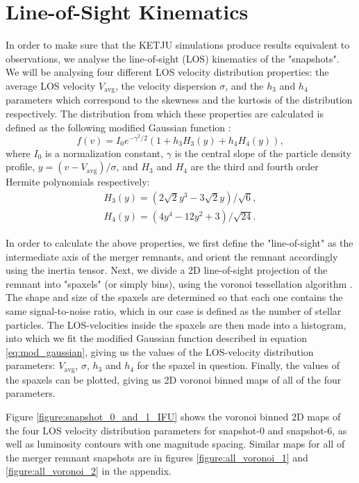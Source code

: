 \documentclass[english, oneside]{HYgradu}
\begin{document}
\section{Line-of-Sight Kinematics}

In order to make sure that the KETJU simulations produce results equivalent to observations, we analyse the line-of-sight (LOS) kinematics of the "snapshots". We will be analysing four different LOS velocity distribution properties: the average LOS velocity $V_\mathrm{avg}$, the velocity dispersion $\sigma$, and the $h_3$ and $h_4$ parameters which correspond to the skewness and the kurtosis of the distribution respectively. The distribution from which these properties are calculated is defined as the following modified Gaussian function \citep{Rantala2018}:
\begin{equation}
f(v) = I_0 e^{-\gamma^2/2}(1 + h_3 H_3(y) + h_4 H_4(y)), \label{eq:mod_gaussian}
\end{equation} 
where $I_0$ is a normalization constant, $\gamma$ is the central slope of the particle density profile, $y = (v - V_\mathrm{avg})/\sigma$, and $H_3$ and $H_4$ are the third and fourth order Hermite polynomials respectively:
\begin{eqnarray}
H_3(y) = \left(2\sqrt{2}y^3 - 3\sqrt{2}y\right) / \sqrt{6}, \\
H_4(y) = \left(4y^4 - 12y^2 + 3 \right) / \sqrt{24}.
\end{eqnarray}

In order to calculate the above properties, we first define the "line-of-sight" as the intermediate axis of the merger remnants, and orient the remnant accordingly using the inertia tensor. Next, we divide a 2D line-of-sight projection of the remnant into "spaxels" (or simply bins), using the voronoi tessellation algorithm \citep{Cappellari2003}. The shape and size of the spaxels are determined so that each one contains the same signal-to-noise ratio, which in our case is defined as the number of stellar particles. The LOS-velocities inside the spaxels are then made into a histogram, into which we fit the modified Gaussian function described in equation \ref{eq:mod_gaussian}, giving us the values of the LOS-velocity distribution parameters: $V_\mathrm{avg}$, $\sigma$, $h_3$ and $h_4$ for the spaxel in question. Finally, the values of the spaxels can be plotted, giving us 2D voronoi binned maps of all of the four parameters.

Figure \ref{figure:snapshot_0_and_1_IFU} shows the voronoi binned 2D maps of the four LOS velocity distribution parameters for snapshot-0 and snapshot-6, as well as luminosity contours with one magnitude spacing. Similar maps for all of the merger remnant snapshots are in figures \ref{figure:all_voronoi_1} and \ref{figure:all_voronoi_2} in the appendix.
\end{document}

